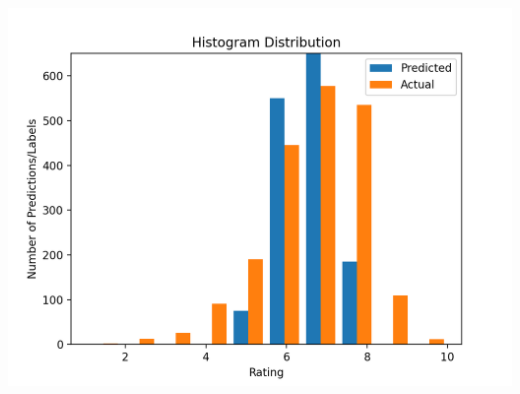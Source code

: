 \documentclass[11pt]{article}
\begin{document}
\begin{minipage}{0.45\textwidth}
\mbox{}\\
\includegraphics[scale=0.5]{random_forest/histogram.png}
\end{minipage}
\end{document}

